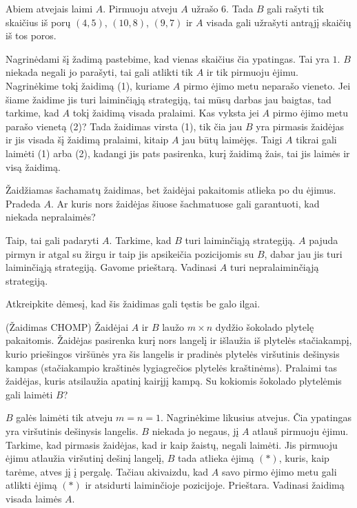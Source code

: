 Abiem atvejais laimi $A$. Pirmuoju atveju $A$ užrašo $6$. Tada $B$ gali rašyti tik
skaičius iš porų $(4,5)$, $(10,8)$, $(9,7)$ ir $A$ visada gali užrašyti antrąjį
skaičių iš tos poros.

Nagrinėdami šį žadimą pastebime, kad vienas skaičius čia ypatingas. Tai yra
$1$. $B$ niekada negali jo parašyti, tai gali atlikti tik $A$ ir tik
pirmuoju ėjimu. Nagrinėkime tokį žaidimą (1), kuriame $A$ pirmo ėjimo metu
neparašo vieneto. Jei šiame žaidime jis turi laiminčiąją strategiją, tai
mūsų darbas jau baigtas, tad tarkime, kad $A$ tokį žaidimą visada pralaimi.
Kas vyksta jei $A$ pirmo ėjimo metu parašo vienetą (2)? Tada žaidimas virsta
(1), tik čia jau $B$ yra pirmasis žaidėjas ir jis visada šį žaidimą
pralaimi, kitaip $A$ jau būtų laimėjęs. Taigi $A$ tikrai gali laimėti (1)
arba (2), kadangi jis pats pasirenka, kurį žaidimą žais, tai jis laimės ir
visą žaidimą. 

\begin{pavnr}
  Žaidžiamas šachamatų žaidimas, bet žaidėjai pakaitomis atlieka po du
  ėjimus. Pradeda $A$. Ar kuris nors žaidėjas šiuose šachmatuose gali
  garantuoti, kad niekada nepralaimės? 
\end{pavnr}

Taip, tai gali padaryti $A$. Tarkime, kad $B$ turi laiminčiąją strategiją.
$A$ pajuda pirmyn ir atgal su žirgu ir taip jis apsikeičia pozicijomis su
$B$, dabar jau jis turi laiminčiąją strategiją. Gavome prieštarą. Vadinasi
$A$ turi nepralaiminčiąją strategiją. 

\begin{pastaba}
  Atkreipkite dėmesį, kad šis žaidimas gali tęstis be galo ilgai.
\end{pastaba}

\begin{pavnr}{(Žaidimas CHOMP)}
  Žaidėjai $A$ ir $B$ laužo $m\times n$ dydžio šokolado plytelę pakaitomis.
  Žaidėjas pasirenka kurį nors langelį ir išlaužia iš plytelės stačiakampį,
  kurio  priešingos viršūnės yra šis langelis ir pradinės plytelės
  viršutinis dešinysis kampas (stačiakampio kraštinės lygiagrečios plytelės
  kraštinėms).  Pralaimi tas žaidėjas, kuris atsilaužia apatinį kairįjį
  kampą. Su kokiomis šokolado plytelėmis gali laimėti $B$?
\end{pavnr}

$B$ galės laimėti tik atveju $m=n=1$. Nagrinėkime likusius atvejus. Čia
ypatingas yra viršutinis dešinysis langelis. $B$ niekada jo negaus, jį $A$
atlauš pirmuoju ėjimu. Tarkime, kad pirmasis žaidėjas, kad ir kaip žaistų,
negali laimėti. Jis pirmuoju ėjimu atlaužia viršutinį dešinį langelį, $B$
tada atlieka ėjimą $(*)$, kuris, kaip tarėme, atves jį į pergalę. Tačiau
akivaizdu, kad $A$ savo pirmo ėjimo metu gali atlikti ėjimą $(*)$ ir
atsidurti laiminčioje pozicijoje. Prieštara. Vadinasi žaidimą visada laimės
$A$. 

